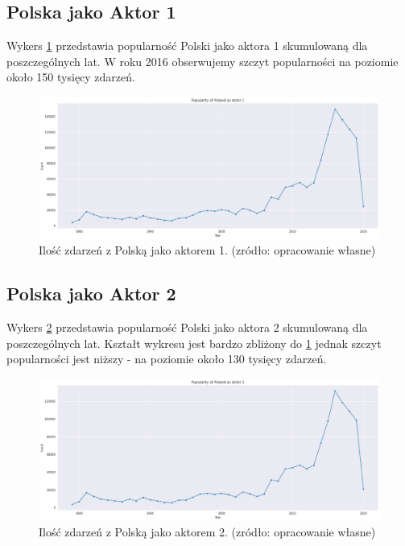 \documentclass[11pt]{report}
\begin{document}
 \subsection{Polska jako Aktor 1}
 Wykers \ref{fig:PLactor1} przedstawia popularność Polski jako aktora 1 skumulowaną dla poszczególnych lat. W roku 2016 obserwujemy szczyt popularności na poziomie około 150 tysięcy zdarzeń.
    \begin{figure}[ht]
	\centering
	\includegraphics[width=0.8 \textwidth]{fig/PL/PLactor1.png}
	\caption{Ilość zdarzeń z Polską jako aktorem 1. (zródło: opracowanie własne)}
		\label{fig:PLactor1}
	\end{figure}
	
 \subsection{Polska jako Aktor 2}
 Wykers \ref{fig:PLactor2} przedstawia popularność Polski jako aktora 2 skumulowaną dla poszczególnych lat. Kształt wykresu jest bardzo zbliżony do \ref{fig:PLactor1} jednak szczyt popularności jest niższy - na poziomie około 130 tysięcy zdarzeń.
     \begin{figure}[ht]
	\centering
	\includegraphics[width=0.8 \textwidth]{fig/PL/PLactor2.png}
	\caption{Ilość zdarzeń z Polską jako aktorem 2. (zródło: opracowanie własne)}
	\label{fig:PLactor2}
	\end{figure}
	
\end{document}
